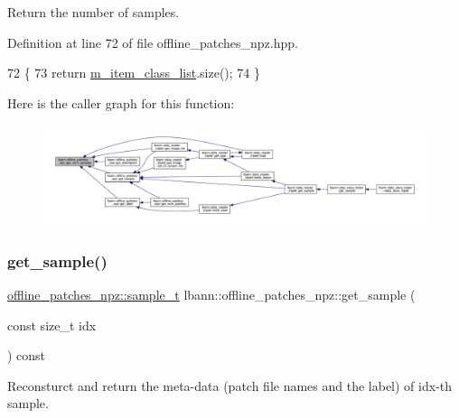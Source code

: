 Return the number of samples. 



Definition at line 72 of file offline\+\_\+patches\+\_\+npz.\+hpp.


\begin{DoxyCode}
72                                  \{
73     \textcolor{keywordflow}{return} \hyperlink{classlbann_1_1offline__patches__npz_a5f90dc1b898f8ad9d7ea16c188738419}{m\_item\_class\_list}.size();
74   \}
\end{DoxyCode}
Here is the caller graph for this function\+:\nopagebreak
\begin{figure}[H]
\begin{center}
\leavevmode
\includegraphics[width=350pt]{classlbann_1_1offline__patches__npz_aa6fa05575f54a29b67d0bba8a2a9d363_icgraph}
\end{center}
\end{figure}
\mbox{\label{classlbann_1_1offline__patches__npz_a9c8ad05ffdf0d44ee1c9b61740dd42e3}} 
\subsubsection{\texorpdfstring{get\+\_\+sample()}{get\_sample()}}
{\footnotesize\ttfamily \hyperlink{classlbann_1_1offline__patches__npz_a61405205f907a697515786d0a9e7858a}{offline\+\_\+patches\+\_\+npz\+::sample\+\_\+t} lbann\+::offline\+\_\+patches\+\_\+npz\+::get\+\_\+sample (\begin{DoxyParamCaption}\item[{const size\+\_\+t}]{idx }\end{DoxyParamCaption}) const}



Reconsturct and return the meta-\/data (patch file names and the label) of idx-\/th sample. 



